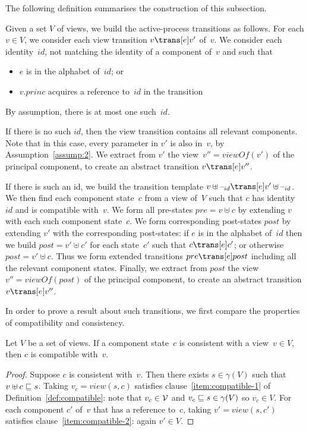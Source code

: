 The following definition summarises the construction of this subsection.
%
\begin{definition}
\label{def:active-process-transition}
Given a set $V$ of views, we build the active-process transitions as follows.
For each $v \in V$, we consider each view transition $v \trans[e] v'$ of~$v$.
%
We consider each identity~$id$, not matching the identity of a component
of~$v$ and such that
%
\begin{itemize}
\item $e$ is in the alphabet of~$id$; or

\item $v.princ$ acquires a reference to~$id$ in the transition
\end{itemize}
%
By assumption, there is at most one such~$id$.

If there is no such $id$, then the view transition contains all relevant
components.  Note that in this case, every parameter in $v'$ is also in~$v$,
by Assumption~\ref{assump:2}.  We extract from $v'$ the view~$v'' =
viewOf(v')$ of the principal component, to create an abstract transition $v
\trans[e] v''$.

If there is such an id, we build the transition template $v \uplus \hole{id}
\trans[e] v' \uplus \hole{id}$.  We then find each component state~$c$ from a
view of~$V$ such that $c$ has identity~$id$ and is compatible with~$v$.
We form all pre-states $pre = v \uplus c$ by extending $v$ with each such
component state~$c$.  We form corresponding post-states $post$ by extending
$v'$ with the corresponding post-states: if $e$ is in the alphabet of~$id$
then we build $post = v' \uplus c'$ for each state~$c'$ such that $c \trans[e]
c'$; or otherwise $post = v' \uplus c$.  Thus we form extended transitions
$pre \trans[e] post$ including all the relevant component states.  Finally, we
extract from $post$ the view~$v'' = viewOf(post)$ of the principal component,
to create an abstract transition $v \trans[e] v''$.
\end{definition}


In order to prove a result about such transitions, we first compare the
properties of compatibility and consistency.
%
\begin{lemma}
\label{lem:consistent-implies-compatible}
Let $V$ be a set of views.
If a component state~$c$ is consistent with a view~$v \in V$, then
$c$ is compatible with~$v$. 
\end{lemma}
%
\begin{proof}
Suppose $c$ is consistent with~$v$.  Then there exists $s \in \gamma(V)$ such
that $v \uplus c \sqsubseteq s$.  Taking $v_c = view(s, c)$ satisfies
clause~\ref{item:compatible-1} of Definition~\ref{def:compatible}: note that
$v_c \in \mathcal{V}$ and $v_c \sqsubseteq s \in \gamma(V)$ so $v_c \in V$.  For each
component $c'$ of~$v$ that has a reference to~$c$, taking $v' = view(s,c')$
satisfies clause~\ref{item:compatible-2}: again $v' \in V$.
\end{proof}

